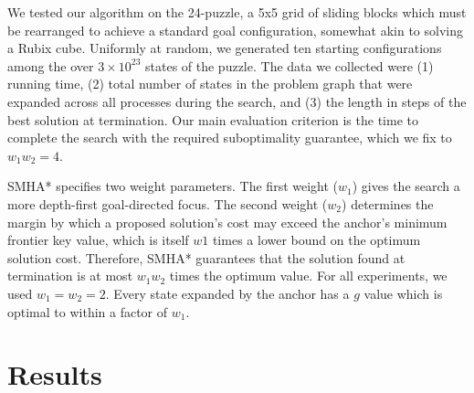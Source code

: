 \documentclass{article}
\begin{document}
We tested our algorithm on the 24-puzzle, a 5x5 grid of sliding blocks which must be rearranged to achieve a standard goal configuration, somewhat akin to solving a Rubix cube. Uniformly at random, we generated ten starting configurations among the over $3\times 10^{23}$ states of the puzzle. The data we collected were (1) running time, (2) total number of states in the problem graph that were expanded across all processes during the search, and (3) the length in steps of the best solution at termination. Our main evaluation criterion is the time to complete the search with the required suboptimality guarantee, which we fix to $w_1 w_2 = 4$.



SMHA* specifies two weight parameters. The first weight ($w_1$) gives the search a more depth-first goal-directed focus. The second weight ($w_2$) determines the margin by which a proposed solution's cost may exceed the anchor's minimum frontier key value, which is itself $w1$ times a lower bound on the optimum solution cost. Therefore, SMHA* guarantees that the solution found at termination is at most $w_1 w_2$ times the optimum value. For all experiments, we used $w_1 = w_2 = 2$. Every state expanded by the anchor has a $g$ value which is optimal to within a factor of $w_1$.

\section{Results}
\end{document}
